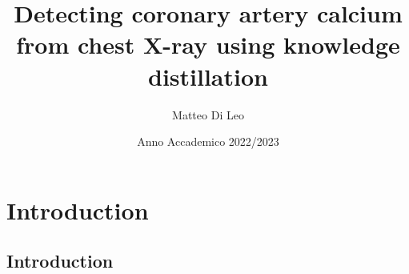 \documentclass[compress,aspectratio=169,xcolor=table]{beamer}
\title{Detecting coronary artery calcium from chest X-ray using knowledge distillation}
\author{Matteo Di Leo}
\date{Anno Accademico 2022/2023}
\begin{document}
\begin{frame}
	\maketitle
\end{frame}

\SetLogo

\section{Introduction}\subsection{Introduction}
\end{document}
